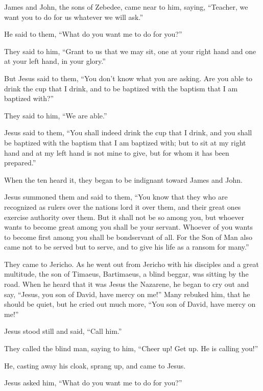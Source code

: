  James and John, the sons of Zebedee, came near to him,
saying, ``Teacher, we want you to do for us whatever we will ask.''

 He said to them, ``What do you want me to do for you?''

 They said to him, ``Grant to us that we may sit, one at
your right hand and one at your left hand, in your glory.''

 But Jesus said to them, ``You don't know what you are
asking. Are you able to drink the cup that I drink, and to be baptized
with the baptism that I am baptized with?''

 They said to him, ``We are able.''

Jesus said to them, ``You shall indeed drink the cup that I drink, and
you shall be baptized with the baptism that I am baptized with;
 but to sit at my right hand and at my left hand is not
mine to give, but for whom it has been prepared.''

 When the ten heard it, they began to be indignant toward
James and John.

 Jesus summoned them and said to them, ``You know that they
who are recognized as rulers over the nations lord it over them, and
their great ones exercise authority over them.  But it
shall not be so among you, but whoever wants to become great among you
shall be your servant.  Whoever of you wants to become
first among you shall be bondservant of all.  For the Son
of Man also came not to be served but to serve, and to give his life as
a ransom for many.''

 They came to Jericho. As he went out from Jericho with his
disciples and a great multitude, the son of Timaeus, Bartimaeus, a blind
beggar, was sitting by the road.  When he heard that it was
Jesus the Nazarene, he began to cry out and say, ``Jesus, you son of
David, have mercy on me!''  Many rebuked him, that he
should be quiet, but he cried out much more, ``You son of David, have
mercy on me!''

 Jesus stood still and said, ``Call him.''

They called the blind man, saying to him, ``Cheer up! Get up. He is
calling you!''

 He, casting away his cloak, sprang up, and came to Jesus.

 Jesus asked him, ``What do you want me to do for you?''

